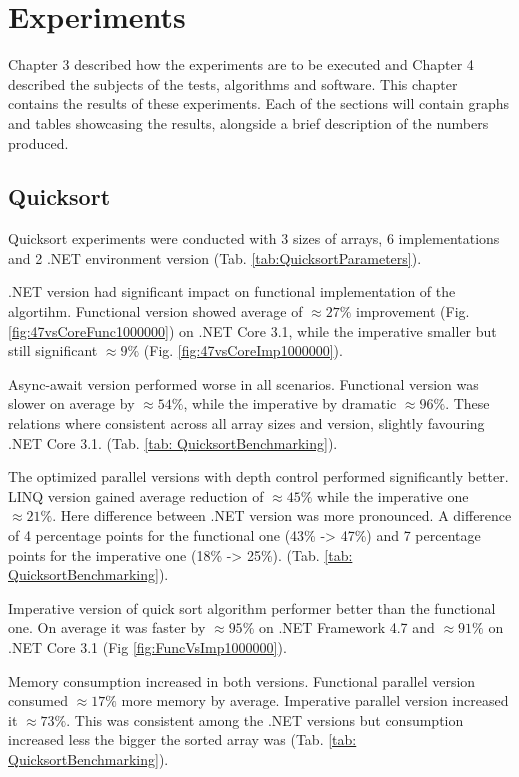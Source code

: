 \clearpage
\chapter{Experiments}
Chapter 3 described how the experiments are to be executed and Chapter 4 described the subjects of the tests, algorithms and software. This chapter contains the results of these experiments. Each of the sections will contain graphs and tables showcasing the results, alongside a brief description of the numbers produced. 

\section{Quicksort}
\label{sec: QuickSort}
Quicksort experiments were conducted with 3 sizes of arrays, 6 implementations and 2 .NET environment version (Tab. \ref{tab:QuicksortParameters}). 

.NET version had significant impact on functional implementation of the algortihm. Functional version showed average of $\approx 27\%$ improvement (Fig. \ref{fig:47vsCoreFunc1000000}) on .NET Core 3.1, while the imperative smaller but still significant  $\approx 9\%$ (Fig. \ref{fig:47vsCoreImp1000000}).

Async-await version performed worse in all scenarios. Functional version was slower on average by $\approx 54\%$, while the imperative by dramatic $\approx 96\%$. These relations where consistent across all array sizes and version, slightly favouring .NET Core 3.1. (Tab. \ref{tab: QuicksortBenchmarking}).

The optimized parallel versions with depth control performed significantly better. LINQ version gained average reduction  of $\approx 45\%$ while the imperative one 
$\approx 21\%$. Here difference between .NET version was more pronounced. A difference of 4 percentage points for the functional one (43\% -> 47\%) and 7 percentage points for the imperative one (18\% -> 25\%). (Tab. \ref{tab: QuicksortBenchmarking}).

Imperative version of quick sort algorithm performer better than the functional one. On average it was faster by $\approx 95\%$ on .NET Framework 4.7 and $\approx 91\%$ on .NET Core 3.1 (Fig \ref{fig:FuncVsImp1000000}).

Memory consumption increased in both versions. Functional parallel version consumed $\approx 17\%$ more memory by average. Imperative parallel version increased it $\approx 73\%$. This was consistent among the .NET versions but consumption increased less the bigger the sorted array was (Tab. \ref{tab: QuicksortBenchmarking}).


